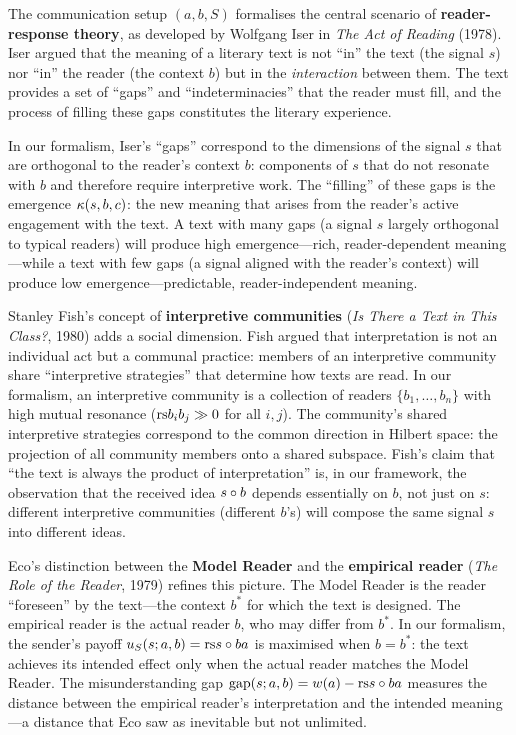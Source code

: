 \begin{interpretation}
\label{interp:ch13:iser_reader_response}
The communication setup $(a, b, S)$ formalises the central scenario of
\textbf{reader-response theory}, as developed by Wolfgang Iser in \emph{The
Act of Reading} (1978).  Iser argued that the meaning of a literary text is
not ``in'' the text (the signal $s$) nor ``in'' the reader (the context $b$)
but in the \emph{interaction} between them.  The text provides a set of
``gaps'' and ``indeterminacies'' that the reader must fill, and the process
of filling these gaps constitutes the literary experience.

In our formalism, Iser's ``gaps'' correspond to the dimensions of the signal
$s$ that are orthogonal to the reader's context $b$: components of $s$ that
do not resonate with $b$ and therefore require interpretive work.  The
``filling'' of these gaps is the emergence $\kappa(s, b, c)$: the new
meaning that arises from the reader's active engagement with the text.
A text with many gaps (a signal $s$ largely orthogonal to typical readers)
will produce high emergence---rich, reader-dependent meaning---while a text
with few gaps (a signal aligned with the reader's context) will produce low
emergence---predictable, reader-independent meaning.

Stanley Fish's concept of \textbf{interpretive communities} (\emph{Is There
a Text in This Class?}, 1980) adds a social dimension.  Fish argued that
interpretation is not an individual act but a communal practice: members of
an interpretive community share ``interpretive strategies'' that determine
how texts are read.  In our formalism, an interpretive community is a
collection of readers $\{b_1, \ldots, b_n\}$ with high mutual resonance
($\mathrm{rs}{b_i}{b_j} \gg 0$ for all $i, j$).  The community's shared
interpretive strategies correspond to the common direction in Hilbert space:
the projection of all community members onto a shared subspace.  Fish's claim
that ``the text is always the product of interpretation'' is, in our
framework, the observation that the received idea $s \circ b$ depends
essentially on $b$, not just on $s$: different interpretive communities
(different $b$'s) will compose the same signal $s$ into different ideas.

Eco's distinction between the \textbf{Model Reader} and the
\textbf{empirical reader} (\emph{The Role of the Reader}, 1979) refines this
picture.  The Model Reader is the reader ``foreseen'' by the text---the
context $b^*$ for which the text is designed.  The empirical reader is the
actual reader $b$, who may differ from $b^*$.  In our formalism, the
sender's payoff $u_S(s; a, b) = \mathrm{rs}{s \circ b}{a}$ is maximised when
$b = b^*$: the text achieves its intended effect only when the actual reader
matches the Model Reader.  The misunderstanding gap
$\mathrm{gap}(s; a, b) = w(a) - \mathrm{rs}{s \circ b}{a}$ measures the distance
between the empirical reader's interpretation and the intended meaning---a
distance that Eco saw as inevitable but not unlimited.
\end{interpretation}

